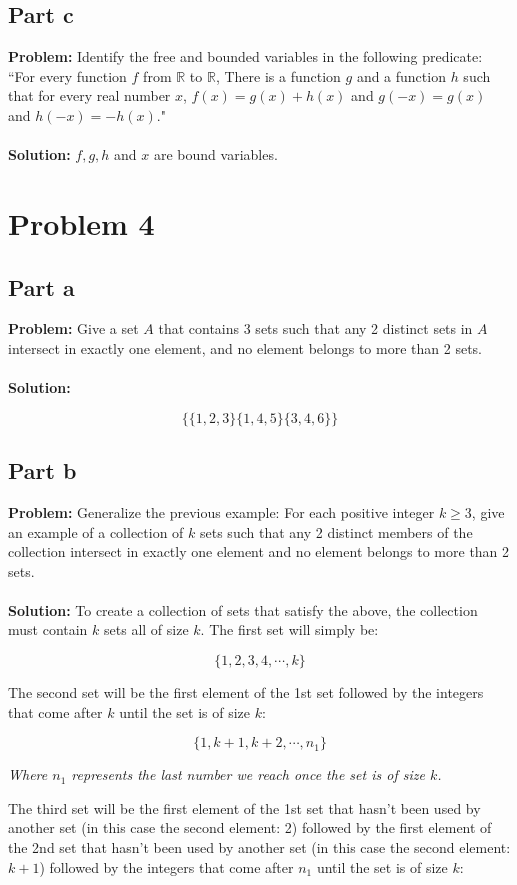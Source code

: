 \documentclass{article}
\begin{document}
\subsection{Part c}
\textbf{Problem:} Identify the free and bounded variables in the following predicate: ``For every function $f$ from $\mathbb R$ to $\mathbb R$, There is a function $g$ and a function $h$ such that for every real number $x$, $f(x)=g(x)+h(x)$ and $g(-x)=g(x)$ and $h(-x)=-h(x)$."
\\\\
\textbf{Solution:} $f,g,h$ and $x$ are bound variables.

\section{Problem 4}
\subsection{Part a}
\textbf{Problem:} Give a set $A$ that contains 3 sets such that any 2 distinct sets in $A$ intersect in exactly one element, and no element belongs to more than 2 sets.
\\\\
\textbf{Solution:}

$$\{\{1,2,3\}\{1,4,5\}\{3,4,6\}\}$$

\subsection{Part b}
\textbf{Problem:} Generalize the previous example:  For each positive integer $k\ge 3$, give an example of a collection of $k$ sets such that any 2 distinct members of the collection intersect in exactly one element and no element belongs to more than 2 sets.
\\\\
\textbf{Solution:} To create a collection of sets that satisfy the above, the collection must contain $k$ sets all of size $k$. The first set will simply be:

$$\{1,2,3,4,\cdots,k\}$$

The second set will be the first element of the 1st set followed by the integers that come after $k$ until the set is of size $k$:

$$\{1,k+1,k+2,\cdots,n_1\}$$

\textit{Where $n_1$ represents the last number we reach once the set is of size $k$.}

The third set will be the first element of the 1st set that hasn't been used by another set (in this case the second element: 2) followed by the first element of the 2nd set that hasn't been used by another set (in this case the second element: $k+1$) followed by the integers that come after $n_1$ until the set is of size $k$:
\end{document}
